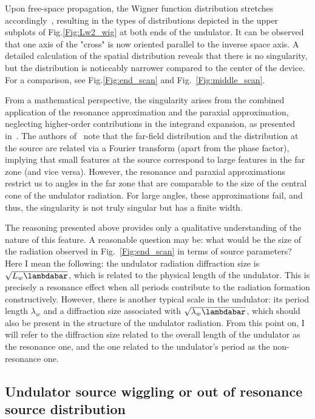     Upon free-space propagation, the Wigner function distribution stretches accordingly~\cite{bazarov_synchrotron_2012}, resulting in the types of distributions depicted in the upper subplots of Fig.\ref{Fig:Lw2_wig} at both ends of the undulator. It can be observed that one axis of the "cross" is now oriented parallel to the inverse space axis. A detailed calculation of the spatial distribution reveals that there is no singularity, but the distribution is noticeably narrower compared to the center of the device. For a comparison, see Fig.\ref{Fig:end_scan} and Fig.~\ref{Fig:middle_scan}.
    
    From a mathematical perspective, the singularity arises from the combined application of the resonance approximation and the paraxial approximation, neglecting higher-order contributions in the integrand expansion, as presented in~\cite{geloni_paraxial_2005}. The authors of~\cite{geloni_fourier_2007} note that the far-field distribution and the distribution at the source are related via a Fourier transform (apart from the phase factor), implying that small features at the source correspond to large features in the far zone (and vice versa). However, the resonance and paraxial approximations restrict us to angles in the far zone that are comparable to the size of the central cone of the undulator radiation. For large angles, these approximations fail, and thus, the singularity is not truly singular but has a finite width.
    
    The reasoning presented above provides only a qualitative understanding of the nature of this feature. A reasonable question may be: what would be the size of the radiation observed in Fig.~\ref{Fig:end_scan} in terms of source parameters? Here I mean the following: the undulator radiation diffraction size is $\sqrt{L_w \lambdabar}$, which is related to the physical length of the undulator. This is precisely a resonance effect when all periods contribute to the radiation formation constructively. However, there is another typical scale in the undulator: its period length $\lambda_w$ and a diffraction size associated with $\sqrt{\lambda_w \lambdabar}$, which should also be present in the structure of the undulator radiation. From this point on, I will refer to the diffraction size related to the overall length of the undulator as the resonance one, and the one related to the undulator's period as the non-resonance one.
    
\subsection{Undulator source wiggling or out of resonance source distribution}

